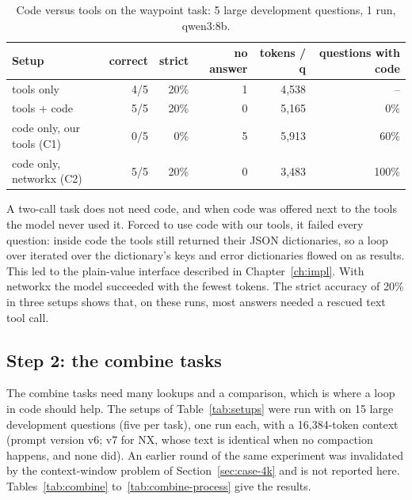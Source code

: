 \begin{table}[ht]
  \centering
  \small
  \caption{Code versus tools on the waypoint task: 5 large development questions, 1 run, qwen3:8b.}
  \label{tab:code-step1}
  \begin{tabular}{lrrrrr}
    \toprule
    Setup & correct & strict & no answer & tokens / q & questions with code \\
    \midrule
    tools only & 4/5 & 20\% & 1 & 4,538 & -- \\
    tools + code & 5/5 & 20\% & 0 & 5,165 & 0\% \\
    code only, our tools (C1) & 0/5 & 0\% & 5 & 5,913 & 60\% \\
    code only, networkx (C2) & 5/5 & 20\% & 0 & 3,483 & 100\% \\
    \bottomrule
  \end{tabular}
\end{table}

A two-call task does not need code, and when code was offered next to the tools the model never used it. Forced to use
code with our tools, it failed every question: inside code the tools still returned their JSON dictionaries, so a loop
over  iterated over the dictionary's keys and error dictionaries flowed on as results. This led
to the plain-value interface described in Chapter~\ref{ch:impl}. With networkx the model succeeded with the fewest
tokens. The strict accuracy of 20\% in three setups shows that, on these runs, most answers needed a rescued text tool
call.

\subsection{Step 2: the combine tasks}

The combine tasks need many lookups and a comparison, which is where a loop in code should help. The setups of
Table~\ref{tab:setups} were run with  on 15 large development questions (five per task), one run each,
with a 16,384-token context (prompt version v6; v7 for NX, whose text is identical when no compaction happens, and none
did). An earlier round of the same experiment was invalidated by the context-window problem of
Section~\ref{sec:case-4k} and is not reported here. Tables~\ref{tab:combine} to~\ref{tab:combine-process} give the
results.

